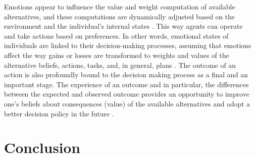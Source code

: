 \documentclass[11pt]{article}
\begin{document}
Emotions appear to influence the value and weight computation of available
alternatives, and these computations are dynamically adjusted based on the
environment and the individual's internal states
\cite{pomerol:ai-decision-making}. This way agents can operate and take actions
based on preferences. In other words, emotional states of individuals are linked
to their decision-making processes, assuming that emotions affect the way gains
or losses are transformed to weights and values of the alternative beliefs,
actions, tasks, and, in general, plans \cite{paulus:emotion-decision-belief}.
The outcome of an action is also profoundly bound to the decision making process
as a final and an important stage. The experience of an outcome and in
particular, the differences between the expected and observed outcome provides
an opportunity to improve one's beliefs about consequences (value) of the
available alternatives and adopt a better decision policy in the future
\cite{pomerol:ai-decision-making, paulus:emotion-decision-belief}.

\section{Conclusion}



\end{document}
